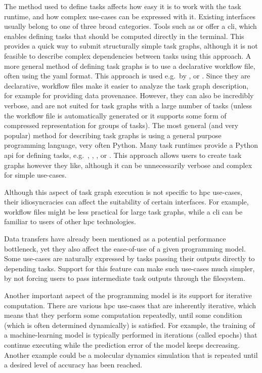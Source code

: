 \begin{description}[wide=0pt]
	\item[Task definition interfaces] The method used to define tasks affects how easy it is to work with the task runtime, and how
		complex use-cases can be expressed with it. Existing interfaces usually belong to one of three
		broad categories. Tools such as \gnuparallel{} or \hypershell{} offer a
		\gls{cli}, which enables defining tasks that should be computed directly in the
		terminal. This provides a quick way to submit structurally simple task graphs, although it is not
		feasible to describe complex dependencies between tasks using this approach. A more general method
		of defining task graphs is to use a declarative workflow file, often using the
		\gls{yaml} format. This approach is used e.g.\ by \pegasus{},
		\autosubmit{} or \merlin{}. Since they are declarative, workflow files make
		it easier to analyze the task graph description, for example for providing data provenance.
		However, they can also be incredibly verbose, and are not suited for task graphs with a large
		number of tasks (unless the workflow file is automatically generated or it supports some form of
		compressed representation for groups of tasks). The most general (and very popular) method for
		describing task graphs is using a general purpose programming language, very often Python. Many
		task runtimes provide a Python \gls{api} for defining tasks, e.g.\
		\dask{}, \ray{}, \parsl{}, \balsam{} or
		\pegasus{}. This approach allows users to create task graphs however they like,
		although it can be unnecessarily verbose and complex for simple use-cases.

		Although this aspect of task graph execution is not specific to \gls{hpc} use-cases,
		their idiosyncracies can affect the suitability of certain interfaces. For example, workflow files
		might be less practical for large task graphs, while a \gls{cli} can be familiar to
		users of other \gls{hpc} technologies.

	\item[Data transfers] Data transfers have already been mentioned as a potential performance bottleneck, yet they also
		affect the ease-of-use of a given programming model. Some use-cases are naturally expressed by
		tasks passing their outputs directly to depending tasks. Support for this feature can make such
		use-cases much simpler, by not forcing users to pass intermediate task outputs through the
		filesystem.

	\item[Iterative computation] Another important aspect of the programming model is its support for iterative computation. There
		are various \gls{hpc} use-cases that are inherently iterative, which means that they
		perform some computation repeatedly, until some condition (which is often determined dynamically)
		is satisfied. For example, the training of a machine-learning model is typically performed in
		iterations (called epochs) that continue executing while the prediction error of the model keeps
		decreasing. Another example could be a molecular dynamics simulation that is repeated until a
		desired level of accuracy has been reached.


\end{description}
